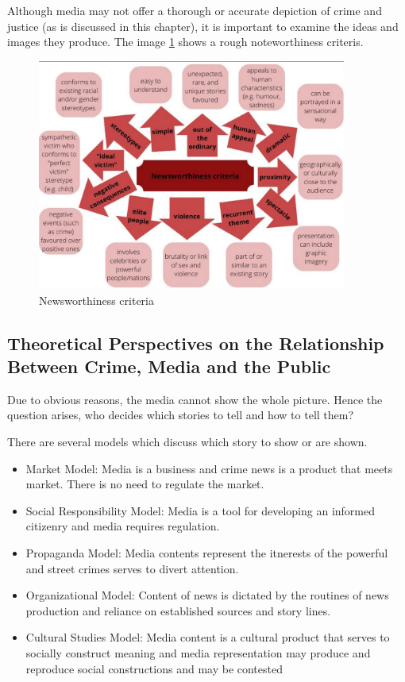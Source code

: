 \documentclass[11pt]{article}
\begin{document}
Although media may not offer a thorough or accurate depiction of crime and justice (as is discussed in this chapter), it is important to examine the ideas and images they produce. The  image \ref{Newsworthy} shows a rough noteworthiness criteris.

\begin{figure}
    \begin{center}
        \includegraphics[width = 4in]{Newsworthy.png}
    \end{center}
    \caption{Newsworthiness criteria \cite{ref: Newsworthiness Criteria Image}}
    \label{Newsworthy}
\end{figure}

\subsection{Theoretical Perspectives on the Relationship Between Crime, Media and the Public}

Due to obvious reasons, the media cannot show the whole picture. Hence the question arises, who decides which stories to tell and how to tell them?

There are several models which discuss which story to show or are shown.

\begin{itemize}
    \item Market Model: Media is a business and crime news is a product that meets market. There is no need to regulate the market.
    
    \item Social Responsibility Model: Media is a tool for developing an informed citizenry and media requires regulation.
    
    \item Propaganda Model: Media contents represent the itnerests of the powerful and street crimes serves to divert attention.
    
    \item Organizational Model: Content of news is dictated by the routines of news production and reliance on established sources and story lines.
    
    \item Cultural Studies Model: Media content is a cultural product that serves to socially construct meaning and media representation may produce and reproduce social constructions and may be contested
\end{itemize}
\end{document}
